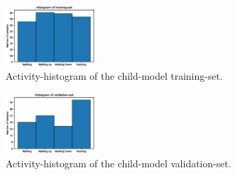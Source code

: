 \documentclass[journal]{IEEEtran}
\begin{document}
\begin{figure}[htbp]
    \centering
    \includegraphics[width=0.3\textwidth]{figures/hist_child_training.eps}
    \caption{Activity-histogram of the child-model training-set.}
    \label{fig:hist_child_training}
\end{figure}

\begin{figure}[htbp]
    \centering
    \includegraphics[width=0.3\textwidth]{figures/hist_child_validation.eps}
    \caption{Activity-histogram of the child-model validation-set.}
    \label{fig:hist_child_validation}
\end{figure}
\end{document}
